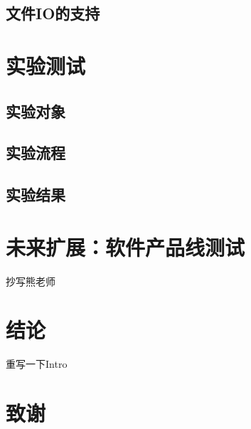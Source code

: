 \documentclass[nofonts]{ctexrep}
\begin{document}
\section{文件IO的支持}

\chapter{实验测试}
\section{实验对象}
\section{实验流程}
\section{实验结果}

\chapter{未来扩展：软件产品线测试}
抄写熊老师

\chapter{结论}
重写一下Intro




\chapter*{致谢}
\end{document}
